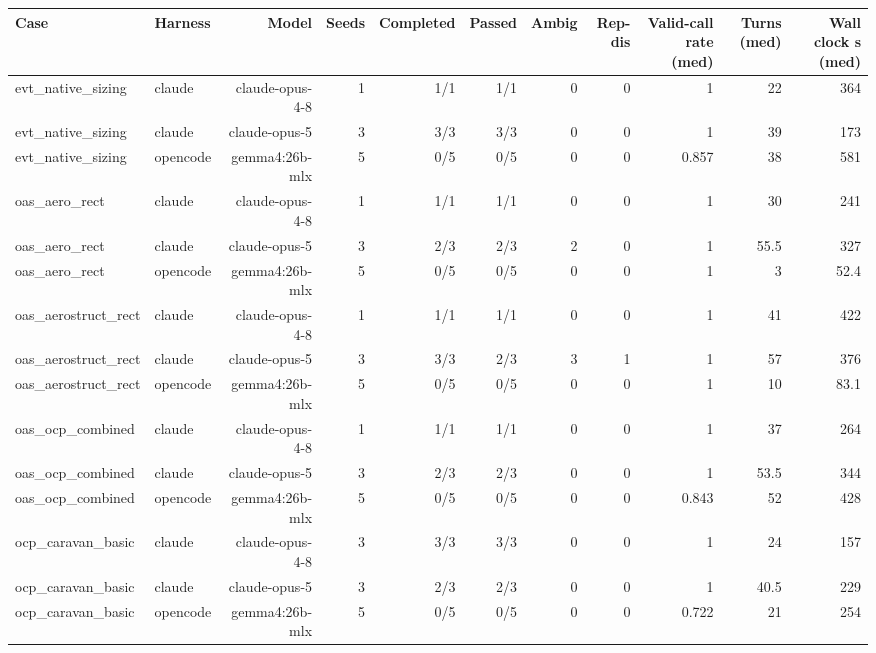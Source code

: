 \begin{tabular}{llrrrrrrrrr}
\toprule
Case & Harness & Model & Seeds & Completed & Passed & Ambig & Rep-dis & Valid-call rate (med) & Turns (med) & Wall clock s (med) \\
\midrule
evt\_native\_sizing & claude & claude-opus-4-8 & 1 & 1/1 & 1/1 & 0 & 0 & 1 & 22 & 364 \\
\addlinespace
evt\_native\_sizing & claude & claude-opus-5 & 3 & 3/3 & 3/3 & 0 & 0 & 1 & 39 & 173 \\
\addlinespace
evt\_native\_sizing & opencode & gemma4:26b-mlx & 5 & 0/5 & 0/5 & 0 & 0 & 0.857 & 38 & 581 \\
\addlinespace
oas\_aero\_rect & claude & claude-opus-4-8 & 1 & 1/1 & 1/1 & 0 & 0 & 1 & 30 & 241 \\
\addlinespace
oas\_aero\_rect & claude & claude-opus-5 & 3 & 2/3 & 2/3 & 2 & 0 & 1 & 55.5 & 327 \\
\addlinespace
oas\_aero\_rect & opencode & gemma4:26b-mlx & 5 & 0/5 & 0/5 & 0 & 0 & 1 & 3 & 52.4 \\
\addlinespace
oas\_aerostruct\_rect & claude & claude-opus-4-8 & 1 & 1/1 & 1/1 & 0 & 0 & 1 & 41 & 422 \\
\addlinespace
oas\_aerostruct\_rect & claude & claude-opus-5 & 3 & 3/3 & 2/3 & 3 & 1 & 1 & 57 & 376 \\
\addlinespace
oas\_aerostruct\_rect & opencode & gemma4:26b-mlx & 5 & 0/5 & 0/5 & 0 & 0 & 1 & 10 & 83.1 \\
\addlinespace
oas\_ocp\_combined & claude & claude-opus-4-8 & 1 & 1/1 & 1/1 & 0 & 0 & 1 & 37 & 264 \\
\addlinespace
oas\_ocp\_combined & claude & claude-opus-5 & 3 & 2/3 & 2/3 & 0 & 0 & 1 & 53.5 & 344 \\
\addlinespace
oas\_ocp\_combined & opencode & gemma4:26b-mlx & 5 & 0/5 & 0/5 & 0 & 0 & 0.843 & 52 & 428 \\
\addlinespace
ocp\_caravan\_basic & claude & claude-opus-4-8 & 3 & 3/3 & 3/3 & 0 & 0 & 1 & 24 & 157 \\
\addlinespace
ocp\_caravan\_basic & claude & claude-opus-5 & 3 & 2/3 & 2/3 & 0 & 0 & 1 & 40.5 & 229 \\
\addlinespace
ocp\_caravan\_basic & opencode & gemma4:26b-mlx & 5 & 0/5 & 0/5 & 0 & 0 & 0.722 & 21 & 254 \\

\end{tabular}
